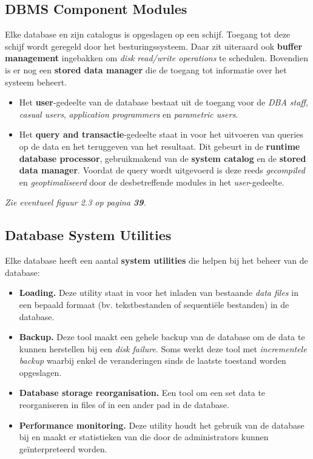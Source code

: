 \subsection{DBMS Component Modules}
Elke database en zijn catalogus is opgeslagen op een schijf. Toegang tot deze schijf wordt geregeld door het besturingssysteem. Daar zit uiteraard ook \textbf{buffer management} ingebakken om \textit{disk read/write operations} te schedulen. Bovendien is er nog een \textbf{stored data manager} die de toegang tot informatie over het systeem beheert.
\begin{itemize}
\item Het \textbf{user}-gedeelte van de database bestaat uit de toegang voor de \textit{DBA staff}, \textit{casual users}, \textit{application programmers} en \textit{parametric users}.

\item Het \textbf{query and transactie}-gedeelte staat in voor het uitvoeren van queries op de data en het teruggeven van het resultaat. Dit gebeurt in de \textbf{runtime database processor}, gebruikmakend van de \textbf{system catalog} en de \textbf{stored data manager}. Voordat de query wordt uitgevoerd is deze reeds \textit{gecompiled} en \textit{geoptimaliseerd} door de desbetreffende modules in het \textit{user}-gedeelte.
\end{itemize}
\textit{Zie eventueel figuur 2.3 op pagina \textbf{39}.}

\subsection{Database System Utilities}
Elke database heeft een aantal \textbf{system utilities} die helpen bij het beheer van de database:
\begin{itemize}
\item\textbf{Loading.} Deze utility staat in voor het inladen van bestaande \textit{data files} in een bepaald formaat (bv. tekstbestanden of sequenti\"ele bestanden) in de database.
\item\textbf{Backup.} Deze tool maakt een gehele backup van de database om de data te kunnen herstellen bij een \textit{disk failure}. Soms werkt deze tool met \textit{incrementele backup} waarbij enkel de veranderingen sinds de laatste toestand worden opgeslagen.
\item\textbf{Database storage reorganisation.} Een tool om een set data te reorganiseren in files of in een ander pad in de database.
\item\textbf{Performance monitoring.} Deze utility houdt het gebruik van de database bij en maakt er statistieken van die door de administrators kunnen ge\"interpreteerd worden.
\end{itemize}

